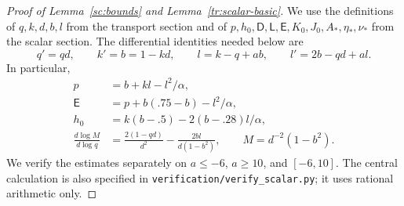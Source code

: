 \documentclass[11pt]{article}
\theoremstyle{definition}
\theoremstyle{remark}
\numberwithin{equation}{section}
\begin{document}
\begin{proof}[Proof of Lemma~\ref{sc:bounds} and Lemma~\ref{tr:scalar-basic}]
We use the definitions of $q,k,d,b,l$ from the transport section and of
$p,h_0,\mathsf D,\mathsf L,\mathsf E,K_0,J_0,A_*,\eta_*,\nu_*$
from the scalar section. The differential identities needed below are
\begin{equation}\label{cert:identities}
 q'=qd,\qquad k'=b=1-kd,\qquad
 l=k-q+ab,\qquad l'=2b-qd+al.
\end{equation}
In particular,
\begin{equation}\label{cert:derived}
 \begin{split}
 p&=b+kl-l^2/\alpha,\\
 \mathsf E&=p+b(.75-b)-l^2/\alpha,\\
 h_0&=k(b-.5)-2(b-.28)l/\alpha,\\
 \frac{d\log M}{d\log q}
 &=\frac{2(1-qd)}{d^2}
       -\frac{2bl}{d(1-b^2)},\qquad M=d^{-2}(1-b^2).
 \end{split}
\end{equation}
We verify the estimates separately on $a\le-6$, $a\ge10$, and
$[-6,10]$. The central calculation is also specified in
\texttt{verification/verify\_scalar.py}; it uses rational arithmetic only.


\end{proof}
\end{document}
